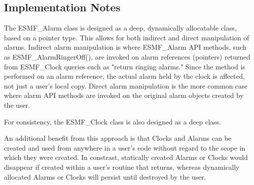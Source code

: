 
\subsection{Implementation Notes}

The ESMF\_Alarm class is designed as a deep, dynamically allocatable class,
based on a pointer type.  This allows for both indirect and direct
manipulation of alarms.  Indirect alarm manipulation is where ESMF\_Alarm API
methods, such as ESMF\_AlarmRingerOff(), are invoked on alarm references
(pointers) returned from ESMF\_Clock queries such as "return ringing alarms."
Since the method is performed on an alarm reference, the actual alarm held
by the clock is affected, not just a user's local copy.  Direct alarm
manipulation is the more common case where alarm API methods are invoked on
the original alarm objects created by the user.

For consistency, the ESMF\_Clock class is also designed as a deep class. 

An additional benefit from this approach is that Clocks and Alarms can be
created and used from anywhere in a user's code without regard to the scope
in which they were created.  In constrast, statically created Alarms or
Clocks would disappear if created within a user's routine that returns,
whereas dynamically allocated Alarms or Clocks will persist until destroyed
by the user.
